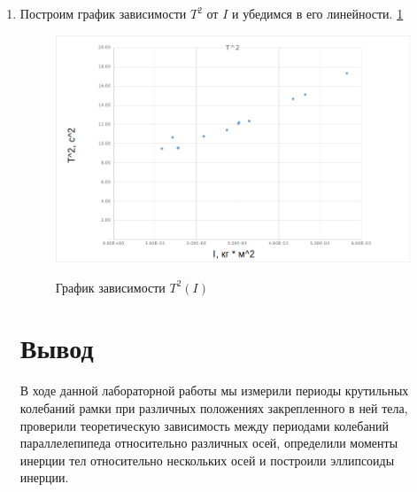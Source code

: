 \documentclass[a4paper,12pt]{article} %
\begin{document}
\begin{enumerate}
\item Построим график зависимости $T^2$ от $I$ и убедимся в его линейности. \ref{pic:6}

\newpage

\begin{figure} [H] \center
	\includegraphics[scale=0.5]{data/graph.png}
	\label{pic:6} \caption[Рис. 6]{График зависимости $T^2(I)$}
\end{figure}

\section{Вывод}
В ходе данной лабораторной работы мы измерили периоды крутильных колебаний рамки при различных положениях закрепленного в ней тела, проверили теоретическую зависимость между периодами колебаний параллелепипеда относительно различных осей, определили моменты инерции тел относительно нескольких осей и построили эллипсоиды инерции.

\end{enumerate}
\end{document}
